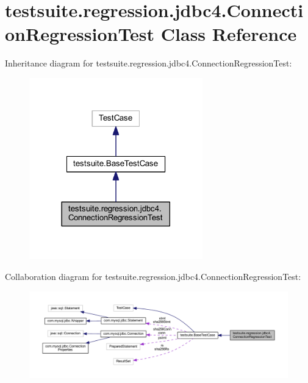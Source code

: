 \hypertarget{classtestsuite_1_1regression_1_1jdbc4_1_1_connection_regression_test}{}\section{testsuite.\+regression.\+jdbc4.\+Connection\+Regression\+Test Class Reference}
\label{classtestsuite_1_1regression_1_1jdbc4_1_1_connection_regression_test}


Inheritance diagram for testsuite.\+regression.\+jdbc4.\+Connection\+Regression\+Test\+:
\nopagebreak
\begin{figure}[H]
\begin{center}
\leavevmode
\includegraphics[width=213pt]{classtestsuite_1_1regression_1_1jdbc4_1_1_connection_regression_test__inherit__graph}
\end{center}
\end{figure}


Collaboration diagram for testsuite.\+regression.\+jdbc4.\+Connection\+Regression\+Test\+:
\nopagebreak
\begin{figure}[H]
\begin{center}
\leavevmode
\includegraphics[width=350pt]{classtestsuite_1_1regression_1_1jdbc4_1_1_connection_regression_test__coll__graph}
\end{center}
\end{figure}
